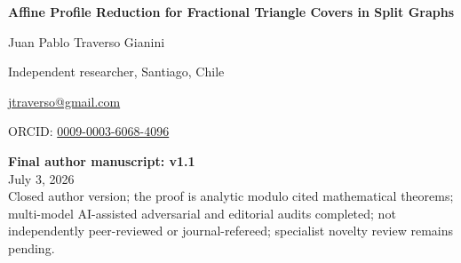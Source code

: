 \documentclass[11pt,a4paper]{article}
\newcommand{\statusblock}{%
\begin{center}
\small
\textbf{Final author manuscript: v1.1}\\
July 3, 2026\\
Closed author version; the proof is analytic modulo cited mathematical theorems; multi-model AI-assisted adversarial and editorial audits completed; not independently peer-reviewed or journal-refereed; specialist novelty review remains pending.
\end{center}}
\begin{document}
\begin{titlepage}
\centering
\vspace*{2.2cm}
{\sffamily\bfseries\fontsize{22}{27}\selectfont Affine Profile Reduction for Fractional Triangle Covers in Split Graphs\par}
\vspace{1.5cm}
{\Large Juan Pablo Traverso Gianini\par}
\vspace{0.35cm}
{\normalsize Independent researcher, Santiago, Chile\par}
\vspace{0.2cm}
{\normalsize \href{mailto:jtraverso@gmail.com}{jtraverso@gmail.com}\par}
{\normalsize ORCID: \href{https://orcid.org/0009-0003-6068-4096}{0009-0003-6068-4096}\par}
\vfill
\statusblock
\vfill
\end{titlepage}
\setcounter{page}{1}
\end{document}

